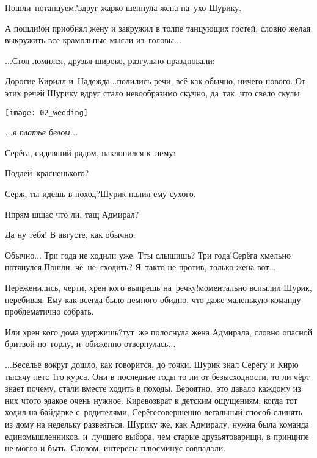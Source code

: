 {\begin{minipage}{0.48\textwidth}
	\indent \diagdash Пошли~потанцуем?\mdash вдруг жарко шепнула жена на~ухо Шурику.
	
	\indent \diagdash А пошли!\mdash он приобнял жену и закружил в толпе танцующих гостей, словно желая выкружить все крамольные мысли из~головы$\ldots$
	
	\indent $\ldots$Стол ломился, друзья широко, разгульно праздновали:
	
	\indent \diagdash Дорогие Кирилл и~Надежда$\ldots$\mdash полились речи, всё как обычно, ничего нового. От этих речей Шурику вдруг стало невообразимо скучно, да~так, что свело скулы.
\end{minipage}\hfill
\begin{minipage}{0.5\textwidth}
	\centering
	\texttt{[image: 02\_wedding]}
	
	{\small\textit{...в платье белом...}}
\end{minipage}

Серёга, сидевший рядом, наклонился к~нему:

\diagdash Подлей~красненького?

\diagdash Серж, ты идёшь в поход?\mdash Шурик налил ему сухого. 

\diagdash П\sdash прям щ\sdash щас что ли, тащ Адмирал?

\diagdash Да ну тебя! В августе, как обычно.

\diagdash Обычно$\ldots$ Три года не ходили уже. Т\sdash ты слышишь? Три года!\mdash Серёга хмельно потянулся.\mdash Пошли, чё~не~сходить? Я~так\sdash то не против, только жена вот$\ldots$

\diagdash Переженились, черти, хрен кого выпрешь на~речку!\mdash моментально вспылил Шурик, перебивая. Ему как всегда было немного обидно, что даже маленькую команду проблематично собрать.

\diagdash Или хрен кого дома удержишь?\mdash тут~же полоснула жена Адмирала, словно опасной бритвой по~горлу, и~обиженно отвернулась$\ldots$ 

\vspace{0.5cm}
$\ldots$Веселье вокруг дошло, как говорится, до точки. Шурик знал Серёгу и Кирю тысячу лет\mdash с 1\sdash го курса. Они в последние годы то ли от безысходности, то ли чёрт знает почему, стали вместе ходить в походы. Вероятно,~это давало каждому из них что\sdash то эдакое очень нужное. Кире\mdash возврат к детским ощущениям, когда тот ходил на байдарке с~родителями, Серёге\mdash совершенно легальный способ слинять из дому на недельку развеяться. Шурику же, как Адмиралу, нужна была команда единомышленников, и~лучшего выбора, чем старые друзья\sdash товарищи, в принципе не могло и быть. Словом, интересы плюс\sdash минус совпадали. 

}
